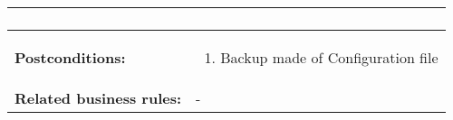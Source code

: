 \begin{tabularx}{\linewidth}{|l|X|}
\begin{enumerate}
						\end{enumerate} \\
\hline
\textbf{Postconditions:} & 
  \begin{minipage}{\linewidth}
  \vspace{0.05em}
  \begin{enumerate}
    \item Backup made of Configuration file
  \end{enumerate}
  \vspace{0.05em}
\end{minipage}
\\
\hline
\textbf{Related business rules:} & - \\
\hline
\end{tabularx}



